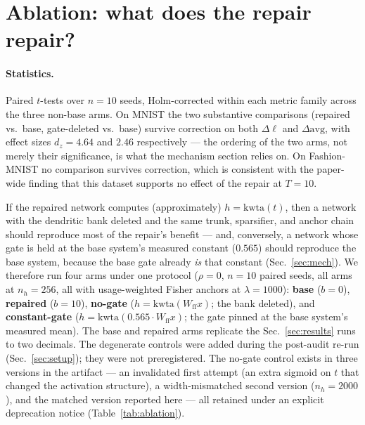 \documentclass[10pt]{article}
\begin{document}
\section{Ablation: what does the repair repair?}
\label{sec:ablstat}

\paragraph{Statistics.} Paired $t$-tests over $n=10$ seeds, Holm-corrected within each metric family across the three non-base arms. On MNIST the two substantive comparisons (repaired vs.\ base, gate-deleted vs.\ base) survive correction on both $\Delta\ell$ and $\Delta\mathrm{avg}$, with effect sizes $d_z=4.64$ and $2.46$ respectively --- the ordering of the two arms, not merely their significance, is what the mechanism section relies on. On Fashion-MNIST no comparison survives correction, which is consistent with the paper-wide finding that this dataset supports no effect of the repair at $T=10$.
\label{sec:ablation}

If the repaired network computes (approximately) $h = \mathrm{kwta}(t)$,
then a network with the dendritic bank deleted and the same trunk,
sparsifier, and anchor chain should reproduce most of the repair's
benefit --- and, conversely, a network whose gate is held at the base
system's measured constant ($0.565$) should reproduce the base system,
because the base gate already \emph{is} that constant
(Sec.~\ref{sec:mech}). We therefore run four arms under one protocol
($\rho{=}0$, $n{=}10$ paired seeds, all arms at $n_h{=}256$, all with
usage-weighted Fisher anchors at $\lambda{=}1000$): \textbf{base}
($b{=}0$), \textbf{repaired} ($b{=}10$), \textbf{no-gate}
($h = \mathrm{kwta}(W_{\mathrm{ff}} x)$; the bank deleted), and
\textbf{constant-gate} ($h = \mathrm{kwta}(0.565 \cdot
W_{\mathrm{ff}} x)$; the gate pinned at the base system's measured
mean). The base and repaired arms replicate the Sec.~\ref{sec:results}
runs to two decimals. The degenerate controls were added during the
post-audit re-run (Sec.~\ref{sec:setup}); they were not
preregistered. The no-gate control exists in three versions in the
artifact --- an invalidated first attempt (an extra sigmoid on $t$ that
changed the activation structure), a width-mismatched second version
($n_h{=}2000$), and the matched version reported here --- all retained
under an explicit deprecation notice (Table~\ref{tab:ablation}).
\end{document}
